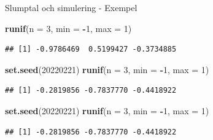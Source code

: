 \documentclass[
  11pt,
  ignorenonframetext,
  handout]{beamer}
\newenvironment{Shaded}{\begin{snugshade}}{\end{snugshade}}
\newcommand{\AttributeTok}[1]{\textcolor[rgb]{0.13,0.29,0.53}{#1}}
\newcommand{\DecValTok}[1]{\textcolor[rgb]{0.00,0.00,0.81}{#1}}
\newcommand{\FunctionTok}[1]{\textcolor[rgb]{0.13,0.29,0.53}{\textbf{#1}}}
\newcommand{\NormalTok}[1]{#1}
\newcommand{\SpecialCharTok}[1]{\textcolor[rgb]{0.81,0.36,0.00}{\textbf{#1}}}
\begin{document}
\begin{frame}[fragile]{Slumptal och simulering - Exempel}
\protect{}\label{slumptal-och-simulering---exempel}
\begin{Shaded}
\begin{Highlighting}[]
\FunctionTok{runif}\NormalTok{(}\AttributeTok{n =} \DecValTok{3}\NormalTok{, }\AttributeTok{min =} \SpecialCharTok{{-}}\DecValTok{1}\NormalTok{, }\AttributeTok{max =} \DecValTok{1}\NormalTok{)}
\end{Highlighting}
\end{Shaded}

\pause

\begin{verbatim}
## [1] -0.9786469  0.5199427 -0.3734885
\end{verbatim}

\pause

\begin{Shaded}
\begin{Highlighting}[]
\FunctionTok{set.seed}\NormalTok{(}\DecValTok{20220221}\NormalTok{)}
\FunctionTok{runif}\NormalTok{(}\AttributeTok{n =} \DecValTok{3}\NormalTok{, }\AttributeTok{min =} \SpecialCharTok{{-}}\DecValTok{1}\NormalTok{, }\AttributeTok{max =} \DecValTok{1}\NormalTok{)}
\end{Highlighting}
\end{Shaded}

\pause

\begin{verbatim}
## [1] -0.2819856 -0.7837770 -0.4418922
\end{verbatim}

\pause

\begin{Shaded}
\begin{Highlighting}[]
\FunctionTok{set.seed}\NormalTok{(}\DecValTok{20220221}\NormalTok{)}
\FunctionTok{runif}\NormalTok{(}\AttributeTok{n =} \DecValTok{3}\NormalTok{, }\AttributeTok{min =} \SpecialCharTok{{-}}\DecValTok{1}\NormalTok{, }\AttributeTok{max =} \DecValTok{1}\NormalTok{)}
\end{Highlighting}
\end{Shaded}

\pause

\begin{verbatim}
## [1] -0.2819856 -0.7837770 -0.4418922
\end{verbatim}
\end{frame}
\end{document}
